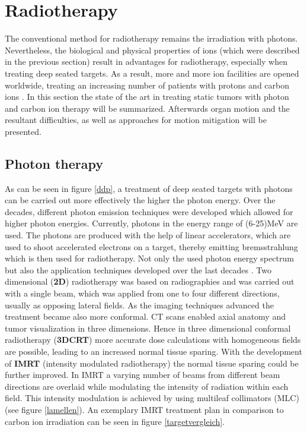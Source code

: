 \section{Radiotherapy}

The conventional method for radiotherapy remains the irradiation with photons. Nevertheless, the biological and physical properties of ions 
(which were described in the previous section) result in advantages for radiotherapy, especially when treating deep seated targets. 
As a result, more and more ion facilities are opened worldwide, treating an increasing number of patients with protons and carbon ions \cite{Loe13}. 
In this section the state of the art in treating static tumors with photon and carbon ion therapy will be summarized. 
Afterwards organ motion and the resultant difficulties, as well as approaches for motion mitigation will be presented. 

\subsection{Photon therapy}

As can be seen in figure \ref{ddp}, a treatment of deep seated targets with photons can be carried out more effectively the higher the photon 
energy. Over the decades, different photon emission techniques were developed which allowed for higher photon energies. 
Currently, photons in the energy range of (6-25)MeV \cite{Ber06} are used. The photons are produced with the help of linear accelerators, which 
are used to shoot accelerated electrons on a target, thereby emitting bremsstrahlung which is then used for radiotherapy.\newline
\newline
Not only the used photon energy spectrum but also the application techniques developed over the last decades \cite{Buc05}. Two dimensional (\textbf{2D}) 
radiotherapy was based on radiographies and was carried out with a single beam, which was applied from one to four different directions, 
usually as opposing lateral fields. As the imaging techniques advanced the treatment became also more conformal. CT scans enabled axial anatomy 
and tumor visualization in three dimensions. Hence in three dimensional conformal radiotherapy (\textbf{3DCRT}) more accurate dose calculations 
with homogeneous fields are possible, leading to an increased normal tissue sparing. With the development of \textbf{IMRT} (intensity 
modulated radiotherapy) the normal tissue sparing could be further improved. In IMRT a varying number of beams 
from different beam directions are overlaid while modulating the intensity of radiation within each field. This intensity modulation is 
achieved by using multileaf collimators (MLC) (see figure \ref{lamellen}). An exemplary IMRT treatment plan in comparison to carbon ion 
irradiation can be seen in figure \ref{targetvergleich}. 

